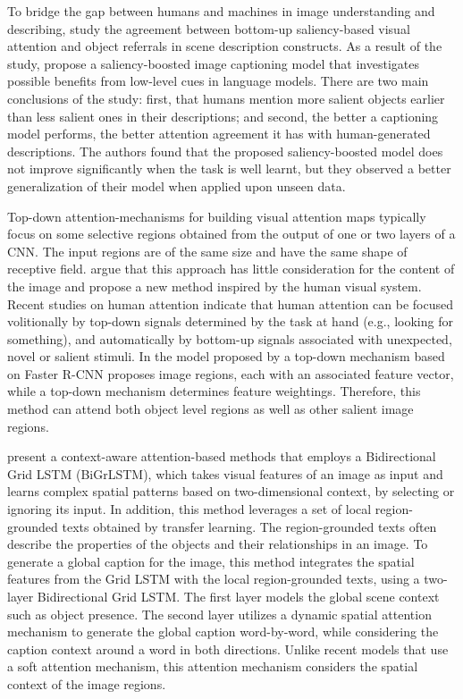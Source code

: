 To bridge the gap between humans and machines in image understanding and describing, \citet{Tavakoliy2017} study the agreement between bottom-up saliency-based visual attention and object referrals in scene description constructs. As a result of the study, \citeauthor{Tavakoliy2017} propose a saliency-boosted image captioning model that investigates possible benefits from low-level cues in language models. There are two main conclusions of the study: first, that humans mention more salient objects earlier than less salient ones in their descriptions; and second, the better a captioning model performs, the better attention agreement it has with human-generated descriptions. The authors found that the proposed saliency-boosted model does not improve significantly when the task is well learnt, but they observed a better generalization of their model when applied upon unseen data.

Top-down attention-mechanisms for building visual attention maps typically focus on some selective regions obtained from the output of one or two layers of a CNN. The input regions are of the same size and have the same shape of receptive field. \citet{Anderson2018_BUTD} argue that this approach has little consideration for the content  of the image and propose a new method inspired by the human visual system. Recent studies on human attention \citep{Buschman2007} indicate that human attention can be focused volitionally by top-down signals determined by the task at hand (e.g., looking for something), and automatically by bottom-up signals associated with unexpected, novel or salient stimuli. In the model proposed by \citeauthor{} a top-down mechanism based on Faster R-CNN \citet{Ren2015} proposes image regions, each with an associated feature vector, while a top-down mechanism determines feature weightings. Therefore, this method can attend both object level regions as well as other salient image regions. 

\citet{Khademi2018} present a context-aware attention-based methods that employs a Bidirectional Grid LSTM (BiGrLSTM), which takes visual features of an image as input and learns complex spatial patterns based on two-dimensional context, by selecting or ignoring its input. In addition, this method leverages a set of local region-grounded texts obtained by transfer learning. The region-grounded texts often describe the properties of the objects and their relationships in an image. To generate a global caption for the image, this method integrates the spatial features from the Grid LSTM with the local region-grounded texts, using a two-layer Bidirectional Grid LSTM. The first layer models the global scene context such as object presence. The second layer utilizes a dynamic spatial attention mechanism to generate the global caption word-by-word, while considering the caption context around a word in both directions. Unlike recent models that use a soft attention mechanism, this attention mechanism considers the spatial context of the image regions.

